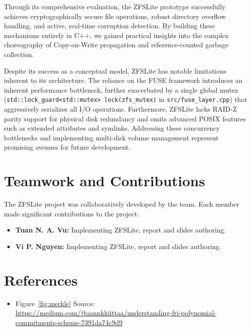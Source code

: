 \documentclass[pdflatex,sn-mathphys-num]{sn-jnl}
\begin{document}
Through its comprehensive evaluation, the ZFSLite prototype successfully achieves cryptographically secure file operations, robust directory overflow handling, and active, real-time corruption detection. By building these mechanisms entirely in C++, we gained practical insights into the complex choreography of Copy-on-Write propagation and reference-counted garbage collection.

Despite its success as a conceptual model, ZFSLite has notable limitations inherent to its architecture. The reliance on the FUSE framework introduces an inherent performance bottleneck, further exacerbated by a single global mutex (\verb+std::lock_guard<std::mutex> lock(zfs_mutex)+ in \verb+src/fuse_layer.cpp+) that aggressively serializes all I/O operations. Furthermore, ZFSLite lacks RAID-Z parity support for physical disk redundancy and omits advanced POSIX features such as extended attributes and symlinks. Addressing these concurrency bottlenecks and implementing multi-disk volume management represent promising avenues for future development.


\section{Teamwork and Contributions}\label{sec:teamwork}

The ZFSLite project was collaboratively developed by the team. Each member made significant contributions to the project:

\begin{itemize}
    \item \textbf{Tuan N. A. Vu:} Implementing ZFSLite, report and slides authoring.
    \item \textbf{Vi P. Nguyen:} Implementing ZFSLite, report and slides authoring.
\end{itemize}


\section{References}
\begin{itemize}
    \item Figure~\ref{fig:merkle} Source: \url{https://medium.com/@aannkkiittaa/understanding-fri-polynomial-commitments-scheme-7391da74c9d9}
\end{itemize}
\end{document}
